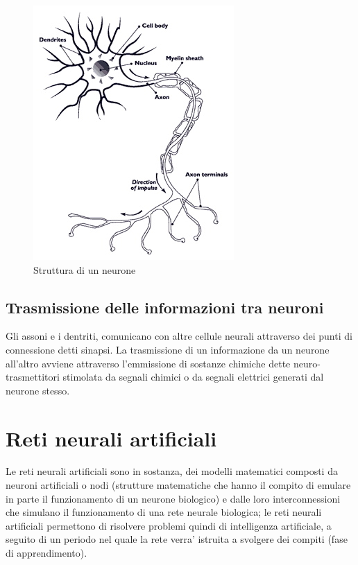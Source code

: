 \documentclass[a4paper,10pt]{book}
\begin{document}
\begin{figure}[h]
	\begin{center}	
		\includegraphics[scale=0.50]{img/neuron.jpg}
		\caption{Struttura di un neurone}
		\label{fig: Struttura di un neurone}
	\end{center}
\end{figure}
 
\subsection{Trasmissione delle informazioni tra neuroni}
Gli assoni e i dentriti, comunicano con altre cellule neurali
attraverso dei punti di connessione detti sinapsi. La trasmissione
di un informazione da un neurone all'altro avviene attraverso
l'emmissione  di sostanze chimiche dette neuro-trasmettitori 
stimolata da segnali chimici o da segnali elettrici 
generati dal neurone stesso.




\section{Reti neurali artificiali}
Le reti neurali artificiali sono in sostanza, dei modelli matematici composti
da neuroni artificiali o nodi (strutture matematiche che hanno il compito
di emulare in parte il funzionamento di un neurone biologico) e dalle loro 
interconnessioni che simulano il funzionamento di una rete neurale biologica;
le reti neurali artificiali permettono di risolvere problemi quindi
di intelligenza artificiale, a seguito di un periodo nel quale la rete verra'
istruita a svolgere dei compiti (fase di apprendimento).
\end{document}
